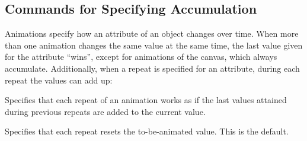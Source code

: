 \subsection{Commands for Specifying Accumulation}

Animations specify how an attribute of an object changes over time. When more
than one animation changes the same value at the same time, the last value
given for the attribute ``wins'', except for animations of the canvas, which
always accumulate. Additionally, when a repeat is specified for an attribute,
during each repeat the values can add up:

\begin{command}{\pgfsysanimkeyaccumulate{}}
\end{command}
\begin{command}{\pgfsys@animation@accumulate{}}
    Specifies that each repeat of an animation works as if the last values
    attained during previous repeats are added to the current value.
\begin{codeexample}[imagesource={standalone/pgfmanual-en-pgfsys-animations-animation-42.svg}]
\end{codeexample}
\end{command}

\begin{command}{\pgfsysanimkeynoaccumulate{}}
\end{command}
\begin{command}{\pgfsys@animation@noaccumulate{}}
    Specifies that each repeat resets the to-be-animated value. This is the
    default.
\begin{codeexample}[imagesource={standalone/pgfmanual-en-pgfsys-animations-animation-43.svg}]
\end{codeexample}
\end{command}


